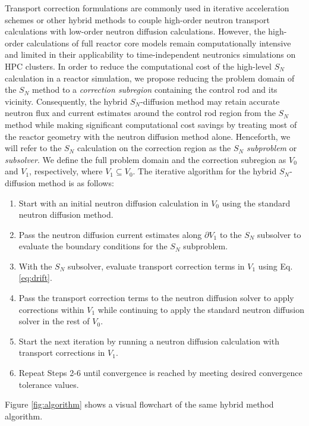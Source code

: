 Transport correction formulations are commonly used in
iterative acceleration schemes or other hybrid methods to couple high-order neutron transport
calculations with low-order neutron diffusion calculations. However, the high-order calculations of
full reactor core models remain computationally intensive and limited in their applicability to
time-independent neutronics simulations on \gls{HPC} clusters.
In order to reduce the computational cost of the high-level $S_N$ calculation in a reactor
simulation, we propose reducing the problem domain of the $S_N$ method to a
\textit{correction subregion} containing the control rod
and its vicinity. Consequently, the hybrid $S_N$-diffusion method may retain accurate neutron flux
and current estimates around the control rod region from the $S_N$ method while making significant
computational cost savings by treating most of the reactor geometry with the neutron diffusion
method alone. Henceforth, we will refer to the $S_N$ calculation on the correction
region as the $S_N$ \textit{subproblem} or \textit{subsolver}. We define the full problem
domain and the correction subregion as $V_0$ and $V_1$, respectively, where
$V_1\subseteq V_0$. The iterative algorithm for the hybrid $S_N$-diffusion method is as follows:
%
\begin{enumerate}
  \item Start with an initial neutron diffusion calculation in $V_0$ using the standard neutron
    diffusion method.
  \item Pass the neutron diffusion current estimates along
    $\partial V_1$ to the $S_N$ subsolver to evaluate the boundary conditions for the $S_N$
    subproblem.
  \item With the $S_N$ subsolver, evaluate transport correction terms in $V_1$ using Eq.
    \ref{eq:drift}.
  \item Pass the transport correction terms to the neutron diffusion solver to apply corrections
    within $V_1$ while continuing to apply the standard neutron diffusion solver
    in the rest of $V_0$.
  \item Start the next iteration by running a neutron diffusion calculation with transport
    corrections in $V_1$.
  \item Repeat Steps 2-6 until convergence is reached by meeting desired convergence tolerance
    values.
\end{enumerate}
%
Figure \ref{fig:algorithm} shows a visual flowchart of the same hybrid method algorithm.


